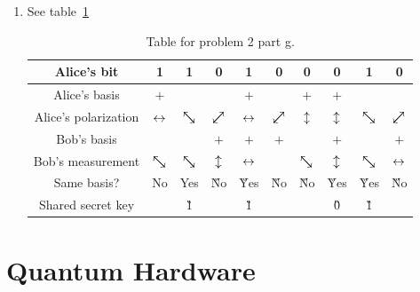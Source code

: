 \documentclass[12pt]{article}
\begin{document}
\begin{enumerate}[label=\textbf{\alph*.}]
    \item See table~\ref{tab:BB84}
    \begin{table}
    \begin{threeparttable}
    \centering
    \begin{tabular}{c||c|c|c|c|c|c|c|c|c}
        Alice's bit &
        1 & 1 & 0 & 1 & 0 & 0 & 0 & 1 & 0 \\
        \hline\hline
        Alice's basis &
        $+$ & \X & \X & $+$ & \X & $+$ & $+$ & \X & \X \\
        \hline
        Alice's polarization &
        $\leftrightarrow$ & $\Done$ & $\Dzero$ & \G{$\leftrightarrow$} & \G{$\Dzero$} & \G{$\updownarrow$} & \G{$\updownarrow$} & \G{$\Done$} & \G{$\Dzero$} \\
        \hline
        Bob's basis &
        \X & \X & $+$ & $+$ & $+$ & \X & $+$ & \X & $+$ \\
        \hline
        Bob's measurement &
        $\Done$ & $\Done$ & $\updownarrow$ & \G{$\leftrightarrow$} &
        \R{$\Dzero$}\tnote{1} & $\Done$ & \G{$\updownarrow$} & \G{$\Done$} & $\leftrightarrow$ \\
        \hline
        Same basis? &
        No & Yes & \G{No} & \G{Yes} & \G{No} & \G{No} & \G{Yes} & \G{Yes} & \G{No} \\
        \hline\hline
        Shared secret key & 
        & \G{1} & & \G{1} & & & \G{0} & \G{1} &
    \end{tabular}
    \caption{Table for problem 2 part g.}%
    \label{tab:BB84}
    \end{threeparttable}
    \end{table}
\end{enumerate}










\section{Quantum Hardware}
\end{document}

